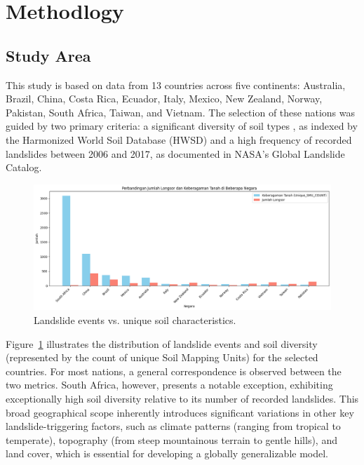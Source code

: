 \section{Methodlogy}

\subsection{Study Area}
This study is based on data from 13 countries across five continents: Australia, Brazil, China, Costa Rica, Ecuador, Italy, Mexico, New Zealand, Norway, Pakistan, South Africa, Taiwan, and Vietnam. The selection of these nations was guided by two primary criteria: a significant diversity of soil types , as indexed by the Harmonized World Soil Database (HWSD) and a high frequency of recorded landslides between 2006 and 2017, as documented in NASA's Global Landslide Catalog.
\begin{figure}[htbp]
    \centerline{\includegraphics[width=\linewidth]{fig1.png}}
    \caption{Landslide events vs. unique soil characteristics.}
    \label{fig:landslide-soil-distribution}
\end{figure}
Figure~\ref{fig:landslide-soil-distribution} illustrates the distribution of landslide events and soil diversity (represented by the count of unique Soil Mapping Units) for the selected countries. For most nations, a general correspondence is observed between the two metrics. South Africa, however, presents a notable exception, exhibiting exceptionally high soil diversity relative to its number of recorded landslides. This broad geographical scope inherently introduces significant variations in other key landslide-triggering factors, such as climate patterns (ranging from tropical to temperate), topography (from steep mountainous terrain to gentle hills), and land cover, which is essential for developing a globally generalizable model.


